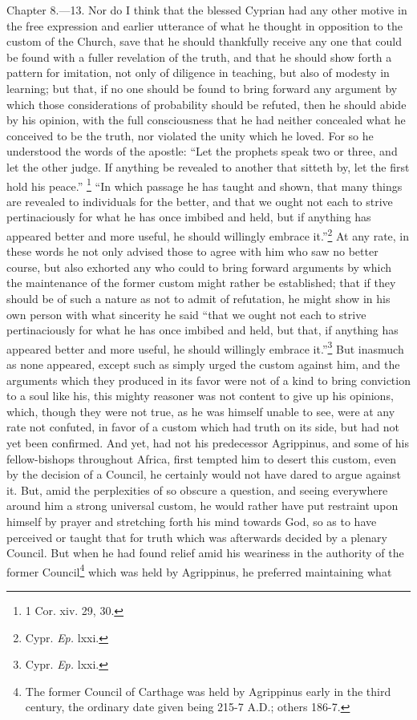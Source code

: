 Chapter 8.—13. Nor do I think that the blessed Cyprian had any other motive in the free expression and earlier utterance of what he thought in opposition to the custom of the Church, save that he should thankfully receive any one that could be found with a fuller revelation of the truth, and that he should show forth a pattern for imitation, not only of diligence in teaching, but also of modesty in learning; but that, if no one should be found to bring forward any argument by which those considerations of probability should be refuted, then he should abide by his opinion, with the full consciousness that he had neither concealed what he conceived to be the truth, nor violated the unity which he loved. For so he understood the words of the apostle: ``Let the prophets speak two or three, and let the other judge. If anything be revealed to another that sitteth by, let the first hold his peace.'' \footnote{\par  1 Cor. xiv. 29, 30.} ``In which passage he has taught and shown, that many things are revealed to individuals for the better, and that we ought not each to strive pertinaciously for what he has once imbibed and held, but if anything has appeared better and more useful, he should willingly embrace it.''\footnote{\par  Cypr. \emph{Ep.} lxxi.} At any rate, in these words he not only advised those to agree with him who saw no better course, but also exhorted any who could to bring forward arguments by which the maintenance of the former custom might rather be established; that if they should be of such a nature as not to admit of refutation, he might show in his own person with what sincerity he said ``that we ought not each to strive pertinaciously for what he has once imbibed and held, but that, if anything has appeared better and more useful, he should willingly embrace it.''\footnote{\par  Cypr. \emph{Ep.} lxxi.} But inasmuch as none appeared, except such as simply urged the custom against him, and the arguments which they produced in its favor were not of a kind to bring conviction to a soul like his, this mighty reasoner was not content to give up his opinions, which, though they were not true, as he was himself unable to see, were at any rate not confuted, in favor of a custom which had truth on its side, but had not yet been confirmed. And yet, had not his predecessor Agrippinus, and some of his fellow-bishops throughout Africa, first tempted him to desert this custom, even by the decision of a Council, he certainly would not have dared to argue against it. But, amid the perplexities of so obscure a question, and seeing everywhere around him a strong universal custom, he would rather have put restraint upon himself by prayer and stretching forth his mind towards God, so as to have perceived or taught that for truth which was afterwards decided by a plenary Council. But when he had found relief amid his weariness in the authority of the former Council\footnote{\par  The former Council of Carthage was held by Agrippinus early in the third century, the ordinary date given being 215-7 A.D.; others 186-7.} which was held by Agrippinus, he preferred maintaining what 
